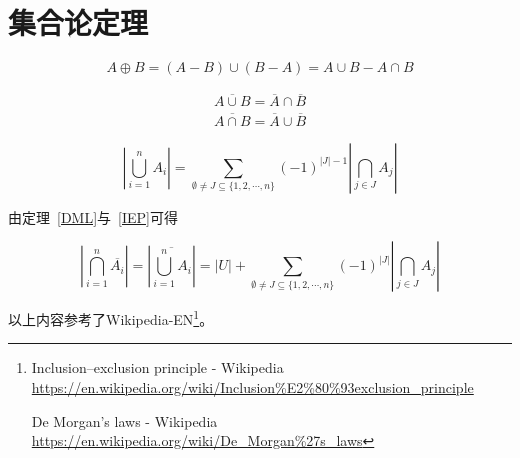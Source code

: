\section{集合论定理}
\begin{theorem}[对称差]
	\begin{displaymath}
		A\oplus B=(A-B)\cup(B-A)=A\cup B - A\cap B
	\end{displaymath}
\end{theorem}
\begin{theorem}\label{DML}
	\begin{eqnarray*}
		\overline{A\cup B}=\overline{A}\cap \overline{B} \\
		\overline{A\cap B}=\overline{A}\cup \overline{B}
	\end{eqnarray*}
\end{theorem}
\begin{theorem}\label{IEP}
	\begin{displaymath}
		\left|\bigcup_{i=1}^n{A_i}\right|=
		\sum_{\emptyset \neq J\subseteq \{1,2,\cdots,n\}}{(-1)^{|J|-1}
			\left|\bigcap_{j\in J}{A_j}\right|}
	\end{displaymath}
\end{theorem}

由定理~\ref{DML}与~\ref{IEP}可得

\begin{theorem}\label{ExDML}
	\begin{displaymath}
		\left|\bigcap_{i=1}^n\overline{A_i}\right|=
		\left|\overline{\bigcup_{i=1}^n{A_i}}\right|=
		|U|+\sum_{\emptyset \neq J\subseteq \{1,2,\cdots,n\}}{(-1)^{|J|}
			\left|\bigcap_{j\in J}{A_j}\right|}
	\end{displaymath}
\end{theorem}

以上内容参考了Wikipedia-EN\footnote{Inclusion–exclusion principle - Wikipedia\\
	\url{https://en.wikipedia.org/wiki/Inclusion\%E2\%80\%93exclusion\_principle}

	De Morgan's laws - Wikipedia\\
    \url{https://en.wikipedia.org/wiki/De\_Morgan\%27s\_laws}}。
